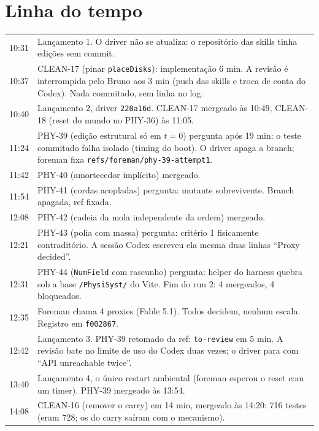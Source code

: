 \documentclass[11pt,a4paper]{article}
\begin{document}
\section{Linha do tempo}

\begin{tabularx}{\linewidth}{@{}lX@{}}
\toprule
10:31 & Lançamento 1. O driver não se atualiza: o repositório das skills tinha
        edições sem commit.\\
10:37 & CLEAN-17 (pinar \texttt{placeDisks}): implementação 6 min. A revisão
        é interrompida pelo Bruno aos 3 min (push das skills e troca de conta
        do Codex). Nada commitado, sem linha no log.\\
10:40 & Lançamento 2, driver \texttt{220a16d}. CLEAN-17 mergeado às 10:49,
        CLEAN-18 (reset do mundo no PHY-36) às 11:05.\\
11:24 & PHY-39 (edição estrutural só em $t=0$) pergunta após 19 min: o teste
        commitado falha isolado (timing do boot). O driver apaga a branch;
        foreman fixa \texttt{refs/foreman/phy-39-attempt1}.\\
11:42 & PHY-40 (amortecedor implícito) mergeado.\\
11:54 & PHY-41 (cordas acopladas) pergunta: mutante sobrevivente. Branch
        apagada, ref fixada.\\
12:08 & PHY-42 (cadeia da mola independente da ordem) mergeado.\\
12:21 & PHY-43 (polia com massa) pergunta: critério 1 fisicamente
        contraditório. A sessão Codex escreveu ela mesma duas linhas
        ``Proxy decided''.\\
12:31 & PHY-44 (\texttt{NumField} com rascunho) pergunta: helper do harness
        quebra sob a base \texttt{/PhysiSyst/} do Vite. Fim do run 2: 4
        mergeados, 4 bloqueados.\\
12:35 & Foreman chama 4 proxies (Fable 5.1). Todos decidem, nenhum escala.
        Registro em \texttt{f002867}.\\
12:42 & Lançamento 3. PHY-39 retomado da ref: \texttt{to-review} em 5 min.
        A revisão bate no limite de uso do Codex duas vezes; o driver para
        com ``API unreachable twice''.\\
13:40 & Lançamento 4, o único restart ambiental (foreman esperou o reset com
        um timer). PHY-39 mergeado às 13:54.\\
14:08 & CLEAN-16 (remover o carry) em 14 min, mergeado às 14:20: 716 testes
        (eram 728; os do carry saíram com o mecanismo).\\

\end{tabularx}
\end{document}
